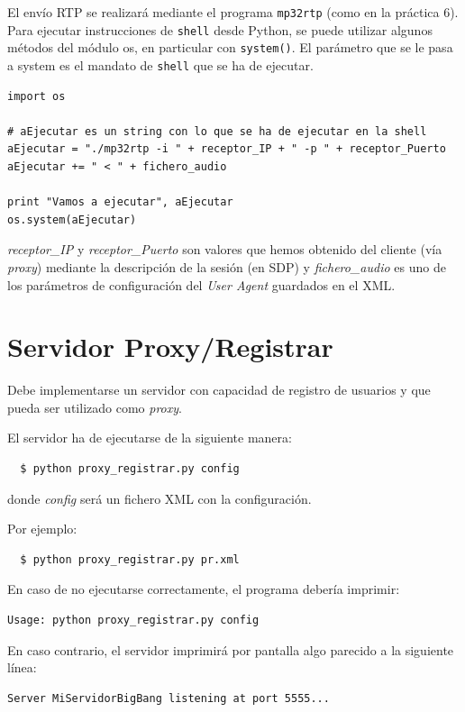 \documentclass[a4paper,11pt]{article}
\begin{document}
El envío RTP se realizará mediante el programa \texttt{mp32rtp} (como en la práctica 6). 
Para ejecutar instrucciones de \texttt{shell} desde Python, se puede utilizar algunos métodos del módulo os, en particular con \texttt{system()}. El parámetro que se le pasa a system es
el mandato de \texttt{shell} que se ha de ejecutar.

\begin{verbatim}
import os

# aEjecutar es un string con lo que se ha de ejecutar en la shell
aEjecutar = "./mp32rtp -i " + receptor_IP + " -p " + receptor_Puerto 
aEjecutar += " < " + fichero_audio

print "Vamos a ejecutar", aEjecutar
os.system(aEjecutar)
\end{verbatim}

\emph{receptor\_IP} y \emph{receptor\_Puerto} son valores que hemos obtenido del cliente (vía \emph{proxy}) mediante la descripción de la sesión (en SDP) y \emph{fichero\_audio} es uno de los parámetros de configuración del \emph{User Agent} guardados en el XML.

\section{Servidor Proxy/Registrar}


Debe implementarse un servidor con capacidad de registro de usuarios y que pueda ser utilizado como \emph{proxy}.

El servidor ha de ejecutarse de la siguiente manera:
\begin{verbatim}
  $ python proxy_registrar.py config
\end{verbatim}

donde \emph{config} será un fichero XML con la configuración.

Por ejemplo:
\begin{verbatim}
  $ python proxy_registrar.py pr.xml
\end{verbatim}

En caso de no ejecutarse correctamente, el programa debería imprimir:
\begin{verbatim}
Usage: python proxy_registrar.py config
\end{verbatim}

En caso contrario, el servidor imprimirá por pantalla algo parecido a la siguiente línea:
\begin{verbatim}
Server MiServidorBigBang listening at port 5555...
\end{verbatim}
\end{document}
